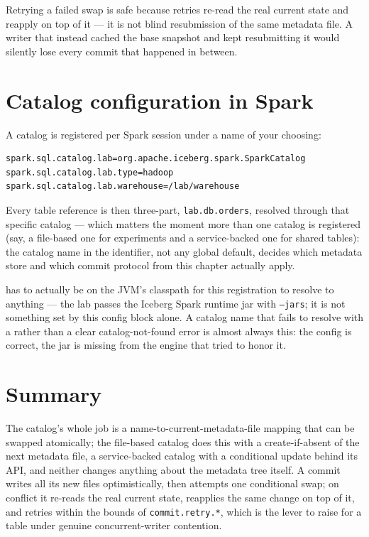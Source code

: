 \begin{warning}
Retrying a failed swap is safe because retries re-read the real current state
and reapply on top of it --- it is not blind resubmission of the same
metadata file. A writer that instead cached the base snapshot and kept
resubmitting it would silently lose every commit that happened in between.
\end{warning}

\section{Catalog configuration in Spark}
\label{sec:cat-spark-config}

A catalog is registered per Spark session under a name of your choosing:

\begin{lstlisting}[language=bash,caption={Registering the lab's file-based Iceberg catalog},captionpos=b,label=lst:cat-register]
spark.sql.catalog.lab=org.apache.iceberg.spark.SparkCatalog
spark.sql.catalog.lab.type=hadoop
spark.sql.catalog.lab.warehouse=/lab/warehouse
\end{lstlisting}

Every table reference is then three-part,
\texttt{lab.db.orders}, resolved through that specific catalog ---
which matters the moment more than one catalog is registered (say, a file-based one
for experiments and a service-backed one for shared tables):
the catalog name in the identifier, not any global default, decides which
metadata store and which commit protocol from this chapter actually apply.

\begin{note}
 has to actually be on the
JVM's classpath for this registration to resolve to anything --- the lab passes the
Iceberg Spark runtime jar with \texttt{--jars}; it is not something set by this
config block alone. A catalog name that fails to resolve with a
 rather than a clear catalog-not-found error
is almost always this: the config is correct, the jar is missing from the
engine that tried to honor it.
\end{note}

\section{Summary}
\label{sec:cat-summary}

The catalog's whole job is a name-to-current-metadata-file mapping that can be
swapped atomically; the file-based catalog does this with a create-if-absent of
the next metadata file, a service-backed catalog with a conditional update behind
its API, and neither changes anything about the metadata tree itself.
A commit writes all its new files optimistically, then attempts one
conditional swap; on conflict it re-reads the real current state, reapplies
the same change on top of it, and retries within the bounds of
\texttt{commit.retry.*}, which is the lever to raise for a table under
genuine concurrent-writer contention.

